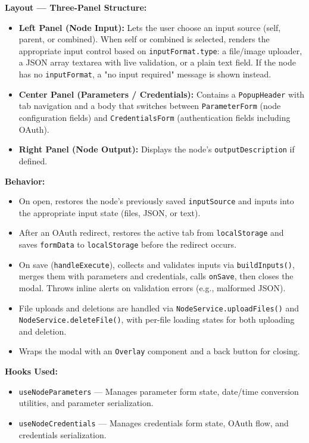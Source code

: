 \textbf{Layout --- Three-Panel Structure:}
\begin{itemize}
    \item \textbf{Left Panel (Node Input):} Lets the user choose an input source (self, parent, or combined). When self or combined is selected, renders the appropriate input control based on \texttt{inputFormat.type}: a file/image uploader, a JSON array textarea with live validation, or a plain text field. If the node has no \texttt{inputFormat}, a "no input required" message is shown instead.
    \item \textbf{Center Panel (Parameters / Credentials):} Contains a \texttt{PopupHeader} with tab navigation and a body that switches between \texttt{ParameterForm} (node configuration fields) and \texttt{CredentialsForm} (authentication fields including OAuth).
    \item \textbf{Right Panel (Node Output):} Displays the node's \texttt{outputDescription} if defined.
\end{itemize}

\textbf{Behavior:}
\begin{itemize}
    \item On open, restores the node's previously saved \texttt{inputSource} and inputs into the appropriate input state (files, JSON, or text).
    \item After an OAuth redirect, restores the active tab from \texttt{localStorage} and saves \texttt{formData} to \texttt{localStorage} before the redirect occurs.
    \item On save (\texttt{handleExecute}), collects and validates inputs via \texttt{buildInputs()}, merges them with parameters and credentials, calls \texttt{onSave}, then closes the modal. Throws inline alerts on validation errors (e.g., malformed JSON).
    \item File uploads and deletions are handled via \texttt{NodeService.uploadFiles()} and \texttt{NodeService.deleteFile()}, with per-file loading states for both uploading and deletion.
    \item Wraps the modal with an \texttt{Overlay} component and a back button for closing.
\end{itemize}

\textbf{Hooks Used:}
\begin{itemize}
    \item \texttt{useNodeParameters} --- Manages parameter form state, date/time conversion utilities, and parameter serialization.
    \item \texttt{useNodeCredentials} --- Manages credentials form state, OAuth flow, and credentials serialization.
\end{itemize}

